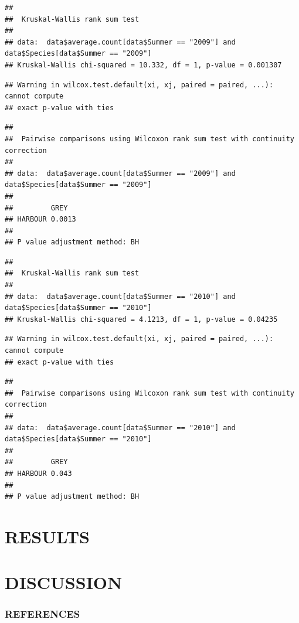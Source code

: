 \documentclass[
]{article}
\begin{document}
\begin{verbatim}
## 
##  Kruskal-Wallis rank sum test
## 
## data:  data$average.count[data$Summer == "2009"] and data$Species[data$Summer == "2009"]
## Kruskal-Wallis chi-squared = 10.332, df = 1, p-value = 0.001307
\end{verbatim}

\begin{verbatim}
## Warning in wilcox.test.default(xi, xj, paired = paired, ...): cannot compute
## exact p-value with ties
\end{verbatim}

\begin{verbatim}
## 
##  Pairwise comparisons using Wilcoxon rank sum test with continuity correction 
## 
## data:  data$average.count[data$Summer == "2009"] and data$Species[data$Summer == "2009"] 
## 
##         GREY  
## HARBOUR 0.0013
## 
## P value adjustment method: BH
\end{verbatim}

\begin{verbatim}
## 
##  Kruskal-Wallis rank sum test
## 
## data:  data$average.count[data$Summer == "2010"] and data$Species[data$Summer == "2010"]
## Kruskal-Wallis chi-squared = 4.1213, df = 1, p-value = 0.04235
\end{verbatim}

\begin{verbatim}
## Warning in wilcox.test.default(xi, xj, paired = paired, ...): cannot compute
## exact p-value with ties
\end{verbatim}

\begin{verbatim}
## 
##  Pairwise comparisons using Wilcoxon rank sum test with continuity correction 
## 
## data:  data$average.count[data$Summer == "2010"] and data$Species[data$Summer == "2010"] 
## 
##         GREY 
## HARBOUR 0.043
## 
## P value adjustment method: BH
\end{verbatim}

\hypertarget{results}{%
\section{RESULTS}\label{results}}

\hypertarget{discussion}{%
\section{DISCUSSION}\label{discussion}}

\hypertarget{references}{%
\subsubsection{REFERENCES}\label{references}}
\end{document}
